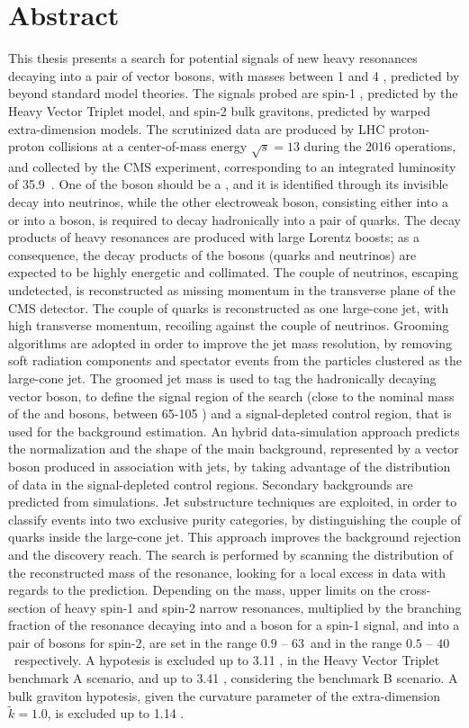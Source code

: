 \chapter*{Abstract}
\label{ch:abstract}

This thesis presents a search for potential signals of new heavy resonances decaying into a pair of vector bosons, with masses between 1 \TeV and 4 \TeV, predicted by beyond standard model theories. The signals probed are spin-1 \Wp, predicted by the Heavy Vector Triplet model, and spin-2 bulk gravitons, predicted by warped extra-dimension models. The scrutinized data are produced by LHC proton-proton collisions at a center-of-mass energy $\sqrt{s}=13$ \TeV during the 2016 operations, and collected by the CMS experiment, corresponding to an integrated luminosity of 35.9~\fbinv. One of the boson should be a \Z, and it is identified through its invisible decay into neutrinos, while the other electroweak boson, consisting either into a \W or into a \Z boson, is required to decay hadronically into a pair of quarks. The decay products of heavy resonances are produced with large Lorentz boosts; as a consequence, the decay products of the bosons (quarks and neutrinos) are expected to be highly energetic and collimated. The couple of neutrinos, escaping undetected, is reconstructed as missing momentum in the transverse plane of the CMS detector. The couple of quarks is reconstructed as one large-cone jet, with high transverse momentum, recoiling against the couple of neutrinos. Grooming algorithms are adopted in order to improve the jet mass resolution, by removing soft radiation components and spectator events from the particles clustered as the large-cone jet. The groomed jet mass is used to tag the hadronically decaying vector boson, to define the signal region of the search (close to the nominal mass of the \W and \Z bosons, between 65-105 \GeV) and a signal-depleted control region, that is used for the background estimation. An hybrid data-simulation approach predicts the normalization and the shape of the main background, represented by a vector boson produced in association with jets, by taking advantage of the distribution of data in the signal-depleted control regions. Secondary backgrounds are predicted from simulations. Jet substructure techniques are exploited, in order to classify events into two exclusive purity categories, by distinguishing the couple of quarks inside the large-cone jet. This approach improves the background rejection and the discovery reach. The search is performed by scanning the distribution of the reconstructed mass of the resonance, looking for a local excess in data with regards to the prediction. Depending on the mass, upper limits on the cross-section of heavy spin-1 and spin-2 narrow resonances, multiplied by the branching fraction of the resonance decaying into \Z and a \W boson for a spin-1 signal, and into a pair of \Z bosons for spin-2, are set in the range $0.9$ -- $63$~\fb and in the range $0.5$ -- $40$~\fb respectively. A \Wp hypotesis is excluded up to 3.11 \TeV, in the Heavy Vector Triplet benchmark A scenario, and up to 3.41 \TeV, considering the benchmark B scenario. A bulk graviton hypotesis, given the curvature parameter of the extra-dimension $\tilde{k}=1.0$, is excluded up to 1.14 \TeV.


\clearpage
